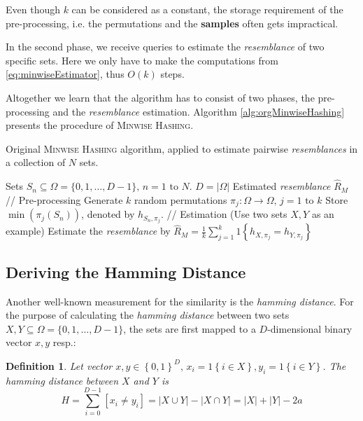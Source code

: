 \documentclass[a4paper]{article}
\newtheorem{mydef}{Definition}
\begin{document}
Even though $k$ can be considered as a constant, the storage requirement of the pre-processing, i.e. the permutations and the \textbf{samples} often gets impractical.

In the second phase, we receive queries to estimate the \emph{resemblance} of two specific sets. Here we only have to make the computations from \vref{eq:minwiseEstimator}, thus $O(k)$ steps.

Altogether we learn that the algorithm has to consist of two phases, the pre-processing and the \emph{resemblance} estimation. Algorithm \vref{alg:orgMinwiseHashing} presents the procedure of \textsc{Minwise Hashing}.

\begin{algorithm}[H]
\caption{Original \textsc{Minwise Hashing} algorithm, applied to estimate pairwise \emph{resemblances} in a collection of $N$ sets.}
\label{alg:orgMinwiseHashing}
\begin{algorithmic}
\Require Sets $S_n \subseteq \Omega = \{0,1,\ldots,D-1\}, \, n = 1 \text{ to } N$. \Comment $D = \left| \Omega \right|$
\Ensure Estimated \emph{resemblance} $\hat{R}_M$
\State // Pre-processing
\State Generate $k$ random permutations $\pi_j: \Omega\longrightarrow\Omega, \, j=1\text{ to }k$
	\State Store $\min(\pi_j(S_n))$, denoted by $h_{S_n,\pi_j}$.
\EndFor
\State
\State // Estimation (Use two sets $X,Y$ as an example)
\State Estimate the \emph{resemblance} by $\hat{R}_M=\frac{1}{k}\sum_{j=1}^k 1 \left\lbrace h_{X,\pi_j}=h_{Y,\pi_j} \right\rbrace$
\end{algorithmic}
\end{algorithm}


\subsection{Deriving the Hamming Distance} \label{sec:hammingDistance}

Another well-known measurement for the similarity is the \emph{hamming distance}. For the purpose of calculating the \emph{hamming distance} between two sets $X,Y \subseteq \Omega = \{0,1,\ldots,D-1\}$, the sets are first mapped to a $D$-dimensional binary vector $x,y$ resp.:
\begin{framed}
\begin{mydef}\label{def:hamming}
Let vector $x,y \in \left\lbrace 0,1 \right\rbrace ^D, \, x_i = 1\left\lbrace i \in X \right\rbrace, y_i = 1\left\lbrace i \in Y \right\rbrace$. The \emph{hamming distance} between $X$ and $Y$ is
\begin{equation}
H=\sum_{i=0}^{D-1}\left[ x_i \neq y_i \right]=|X \cup Y|-|X\cap Y|=|X|+|Y|-2a
\end{equation}
\end{mydef}
\end{framed}
\end{document}
